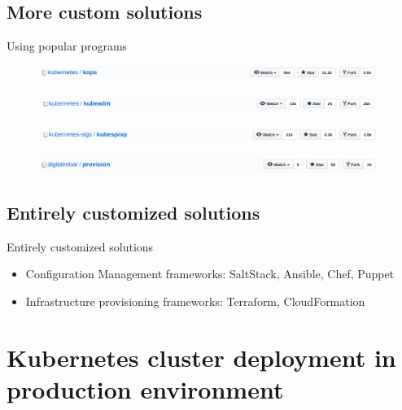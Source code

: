 \documentclass{beamer}
\begin{document}
\subsection{More custom solutions}
\begin{frame}{Using popular programs}%
\begin{figure}
	\includegraphics[width=11cm]{figures/custom-kops.png}
	\label{fig:custom-kops}
\end{figure}
\begin{figure}
	\includegraphics[width=11cm]{figures/custom-kubeadm.png}
	\label{fig:custom-kubeadm}
\end{figure}
\begin{figure}
	\includegraphics[width=11cm]{figures/custom-kubespray.png}
	\label{fig:custom-kubespray}
\end{figure}
\begin{figure}
	\includegraphics[width=11cm]{figures/custom-digitalrebar-provision.png}
	\label{fig:custom-digitalrebar-provision}
\end{figure}
\end{frame}


\subsection{Entirely customized solutions}
\begin{frame}{Entirely customized solutions}%
\begin{itemize}
	\item Configuration Management frameworks: SaltStack, Ansible, Chef, Puppet
	\item Infrastructure provisioning frameworks: Terraform, CloudFormation
\end{itemize}
\end{frame}

\section{Kubernetes cluster deployment in production environment}
\end{document}
